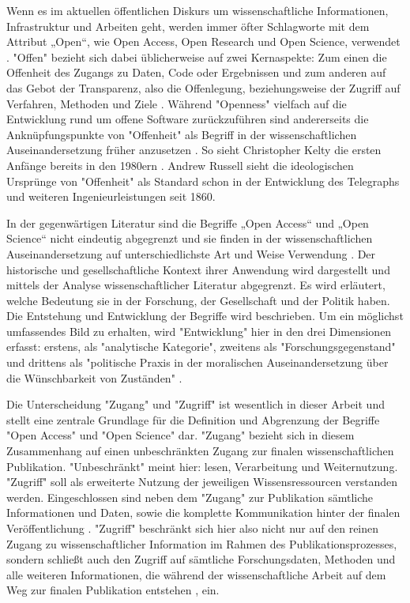 Wenn es im aktuellen öffentlichen Diskurs um wissenschaftliche Informationen, Infrastruktur und Arbeiten geht, werden immer öfter Schlagworte mit dem Attribut „Open“, wie Open Access, Open Research und Open Science, verwendet \cite{bunz_2014} \cite{schulze_2013_open}. "Offen" bezieht sich dabei üblicherweise auf zwei Kernaspekte: Zum einen die Offenheit des Zugangs zu Daten, Code oder Ergebnissen und zum anderen auf das Gebot der Transparenz, also die Offenlegung, beziehungsweise der Zugriff auf Verfahren, Methoden und Ziele \cite{schulze_2013_open}. Während "Openness" vielfach auf die Entwicklung rund um offene Software zurückzuführen sind andererseits die Anknüpfungspunkte von "Offenheit" als Begriff in der wissenschaftlichen Auseinandersetzung früher anzusetzen \cite{Tkacz_2014}. So sieht Christopher Kel­ty die ersten Anfänge bereits in den 1980ern \cite{kelty_2008_two_bits}. Andrew Russell sieht die ideologischen Ursprünge von "Offenheit" als Standard schon in der Entwicklung des Telegraphs und weiteren Ingenieurleistungen seit 1860\cite{Russell_2014}.

In der gegenwärtigen Literatur sind die Begriffe „Open Access“ und „Open Science“ nicht eindeutig abgegrenzt und sie finden in der wissenschaftlichen Auseinandersetzung auf unterschiedlichste Art und Weise Verwendung \cite{cite:9}. Der historische und gesellschaftliche Kontext ihrer Anwendung wird dargestellt und mittels der Analyse wissenschaftlicher Literatur abgegrenzt. Es wird erläutert, welche Bedeutung sie in der Forschung, der Gesellschaft und der Politik haben. Die Entstehung und Entwicklung der Begriffe wird beschrieben. Um ein möglichst umfassendes Bild zu erhalten, wird "Entwicklung" hier in den drei Dimensionen erfasst: erstens, als "analytische Kategorie", zweitens als "Forschungsgegenstand" und drittens als "politische Praxis in der moralischen Auseinandersetzung über die Wünschbarkeit von Zuständen" \cite{cite:10}.

Die Unterscheidung "Zugang" und "Zugriff" ist wesentlich in dieser Arbeit und stellt eine zentrale Grundlage für die Definition und Abgrenzung der Begriffe "Open Access" und "Open Science" dar. "Zugang" bezieht sich in diesem Zusammenhang auf einen unbeschränkten Zugang zur finalen wissenschaftlichen Publikation. "Unbeschränkt" meint hier: lesen\cite{cite:9a}, Verarbeitung und Weiternutzung. "Zugriff" soll als erweiterte Nutzung der jeweiligen Wissensressourcen verstanden werden. Eingeschlossen sind neben dem "Zugang" zur Publikation sämtliche Informationen und Daten, sowie die komplette Kommunikation hinter der finalen Veröffentlichung \cite{cite:9b}. "Zugriff" beschränkt sich hier also nicht nur auf den reinen Zugang zu wissenschaftlicher Information im Rahmen des Publikationsprozesses, sondern schließt auch den Zugriff auf sämtliche Forschungsdaten, Methoden und alle weiteren Informationen, die während der wissenschaftliche Arbeit auf dem Weg zur finalen Publikation entstehen \cite{cite:9c}, ein. 

